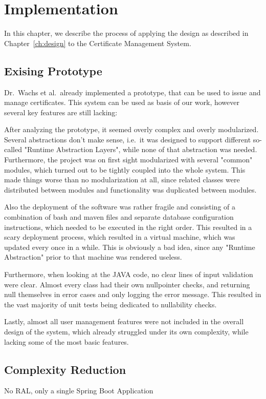 \chapter{Implementation}\label{ch:implementation}
In this chapter, we describe the process of applying the design as described in Chapter~\ref{ch:design} to the
Certificate Management System.

\section{Exising Prototype}\label{sec:exisingPrototype}
Dr.\ Wachs et al.\ already implemented a prototype, that can be used to issue and manage certificates.
This system can be used as basis of our work, however several key features are still lacking:

After analyzing the prototype, it seemed overly complex and overly modularized.
Several abstractions don't make sense, i.e.\ it was designed to support different so-called "Runtime Abstraction
Layers", while none of that abstraction was needed.
Furthermore, the project was on first sight modularized with several "common" modules, which turned out to be tightly
coupled into the whole system.
This made things worse than no modularization at all, since related classes were distributed between modules and
functionality was duplicated between modules.

Also the deployment of the software was rather fragile and consisting of a combination of bash and maven files and
separate database configuration instructions, which needed to be executed in the right order.
This resulted in a scary deployment process, which resulted in a virtual machine, which was updated every once in a
while.
This is obviously a bad idea, since any "Runtime Abstraction" prior to that machine was rendered useless.

Furthermore, when looking at the JAVA code, no clear lines of input validation were clear.
Almost every class had their own nullpointer checks, and returning null themselves in error cases and only logging the
error message.
This resulted in the vast majority of unit tests being dedicated to nullability checks.

Lastly, almost all user management features were not included in the overall design of the system, which already
struggled under its own complexity, while lacking some of the most basic features.

\section{Complexity Reduction}\label{sec:complexityReduction}
No RAL, only a single Spring Boot Application

